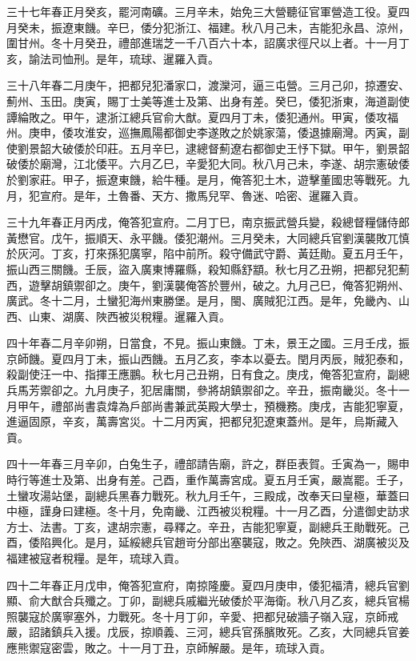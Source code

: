 \begin{pinyinscope}
三十七年春正月癸亥，罷河南礦。三月辛未，始免三大營聽征官軍營造工役。夏四月癸未，振遼東饑。辛巳，倭分犯浙江、福建。秋八月己未，吉能犯永昌、涼州，圍甘州。冬十月癸丑，禮部進瑞芝一千八百六十本，詔廣求徑尺以上者。十一月丁亥，諭法司恤刑。是年，琉球、暹羅入貢。

三十八年春二月庚午，把都兒犯潘家口，渡灤河，逼三屯營。三月己卯，掠遷安、薊州、玉田。庚寅，賜丁士美等進士及第、出身有差。癸巳，倭犯浙東，海道副使譚綸敗之。甲午，逮浙江總兵官俞大猷。夏四月丁未，倭犯通州。甲寅，倭攻福州。庚申，倭攻淮安，巡撫鳳陽都御史李遂敗之於姚家蕩，倭退據廟灣。丙寅，副使劉景韶大破倭於印莊。五月辛巳，逮總督薊遼右都御史王忬下獄。甲午，劉景韶破倭於廟灣，江北倭平。六月乙巳，辛愛犯大同。秋八月己未，李遂、胡宗憲破倭於劉家莊。甲子，振遼東饑，給牛種。是月，俺答犯土木，遊擊董國忠等戰死。九月，犯宣府。是年，土魯番、天方、撒馬兒罕、魯迷、哈密、暹羅入貢。

三十九年春正月丙戌，俺答犯宣府。二月丁巳，南京振武營兵變，殺總督糧儲侍郎黃懋官。戊午，振順天、永平饑。倭犯潮州。三月癸未，大同總兵官劉漢襲敗兀慎於灰河。丁亥，打來孫犯廣寧，陷中前所。殺守備武守爵、黃廷勛。夏五月壬午，振山西三關饑。壬辰，盜入廣東博羅縣，殺知縣舒顓。秋七月乙丑朔，把都兒犯薊西，遊擊胡鎮禦卻之。庚午，劉漢襲俺答於豐州，破之。九月己巳，俺答犯朔州、廣武。冬十二月，土蠻犯海州東勝堡。是月，閩、廣賊犯江西。是年，免畿內、山西、山東、湖廣、陜西被災稅糧。暹羅入貢。

四十年春二月辛卯朔，日當食，不見。振山東饑。丁未，景王之國。三月壬戌，振京師饑。夏四月丁未，振山西饑。五月乙亥，李本以憂去。閏月丙辰，賊犯泰和，殺副使汪一中、指揮王應鵬。秋七月己丑朔，日有食之。庚戌，俺答犯宣府，副總兵馬芳禦卻之。九月庚子，犯居庸關，參將胡鎮禦卻之。辛丑，振南畿災。冬十一月甲午，禮部尚書袁煒為戶部尚書兼武英殿大學士，預機務。庚戌，吉能犯寧夏，進逼固原，辛亥，萬壽宮災。十二月丙寅，把都兒犯遼東蓋州。是年，烏斯藏入貢。

四十一年春三月辛卯，白兔生子，禮部請告廟，許之，群臣表賀。壬寅為一，賜申時行等進士及第、出身有差。己酉，重作萬壽宮成。夏五月壬寅，嚴嵩罷。壬子，土蠻攻湯站堡，副總兵黑春力戰死。秋九月壬午，三殿成，改奉天曰皇極，華蓋曰中極，謹身曰建極。冬十月，免南畿、江西被災稅糧。十一月乙酉，分遣御史訪求方士、法書。丁亥，逮胡宗憲，尋釋之。辛丑，吉能犯寧夏，副總兵王勛戰死。己酉，倭陷興化。是月，延綏總兵官趙岢分部出塞襲寇，敗之。免陜西、湖廣被災及福建被寇者稅糧。是年，琉球入貢。

四十二年春正月戊申，俺答犯宣府，南掠隆慶。夏四月庚申，倭犯福清，總兵官劉顯、俞大猷合兵殲之。丁卯，副總兵戚繼光破倭於平海衛。秋八月乙亥，總兵官楊照襲寇於廣寧塞外，力戰死。冬十月丁卯，辛愛、把都兒破牆子嶺入寇，京師戒嚴，詔諸鎮兵入援。戊辰，掠順義、三河，總兵官孫臏敗死。乙亥，大同總兵官姜應熊禦寇密雲，敗之。十一月丁丑，京師解嚴。是年，琉球入貢。


\end{pinyinscope}
